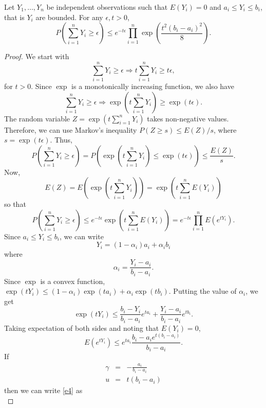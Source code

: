 \documentclass{article}
\begin{document}
\begin{thm}\label{c4t3}
Let $Y_1, \ldots, Y_n$ be independent observations such that $E(Y_i) = 0$ and
$a_i \le Y_i \le b_i$, that is $Y_i$ are bounded. For any $\epsilon, t > 0$,
\[
P\left(\sum_{i=1}^n Y_i \ge \epsilon\right) \le e^{-t\epsilon}\prod_{i=1}^n
\exp\left(\frac{t^2(b_i - a_i)^2}{8}\right).
\]
\end{thm}
\begin{proof}
We start with
\[
\sum_{i=1}^n Y_i \ge \epsilon \Rightarrow t\sum_{i=1}^n Y_i \ge t\epsilon,
\] 
for $t > 0$. Since $\exp$ is a monotonically increasing function, we also have
\[
\sum_{i=1}^n Y_i \ge \epsilon \Rightarrow \exp\left(t\sum_{i=1}^n Y_i\right) \ge 
\exp(t\epsilon).
\]
The random variable $Z = \exp\left(t\sum_{i=1}^n Y_i\right)$ takes non-negative
values. Therefore, we can use Markov's inequality $P(Z \ge s) \le E(Z)/s$, where
$s = \exp(t\epsilon)$. Thus,
\begin{equation}\label{e1}
P\left(\sum_{i=1}^n Y_i \ge \epsilon\right) = 
P\left(\exp\left(t\sum_{i=1}^n Y_i\right) \le \exp(t\epsilon)\right) \le 
\frac{E(Z)}{s}.
\end{equation}
Now,
\[
E(Z) = E\left(\exp\left(t\sum_{i=1}^n Y_i\right)\right) = 
\exp\left(t\sum_{i=1}^n E(Y_i)\right)
\]
so that
\begin{equation}\label{e2}
P\left(\sum_{i=1}^n Y_i \ge \epsilon\right) \le 
e^{-t\epsilon}\exp\left(t\sum_{i=1}^n E(Y_i)\right) = 
e^{-t\epsilon}\prod_{i=1}^n E(e^{tY_i}).
\end{equation}
Since $a_i \le Y_i \le b_i$, we can write
\[
Y_i = (1 - \alpha_i)a_i + \alpha_i b_i
\]
where 
\begin{equation}\label{e3}
\alpha_i = \frac{Y_i - a_i}{b_i - a_i}.
\end{equation}
Since $\exp$ is a convex function, $\exp(tY_i) \le (1 - \alpha_i)\exp(ta_i) +
\alpha_i\exp(tb_i)$. Putting the value of $\alpha_i$, we get
\[
\exp(tY_i) \le \frac{b_i - Y_i}{b_i - a_i}e^{ta_i} + 
\frac{Y_i - a_i}{b_i - a_i}e^{tb_i}.
\]
Taking expectation of both sides and noting that $E(Y_i) = 0$,
\begin{equation}\label{e4}
E(e^{tY_i}) \le e^{ta_i}\frac{b_i - a_i e^{t(b_i-a_i)}}{b_i - a_i}.
\end{equation}
If 
\begin{eqnarray*}
\gamma &=& -\frac{a_i}{b_i - a_i} \\
u &=& t(b_i - a_i)
\end{eqnarray*}
then we can write \eqref{e4} as
\begin{equation}\label{e5}

\end{equation}
\end{proof}
\end{document}
